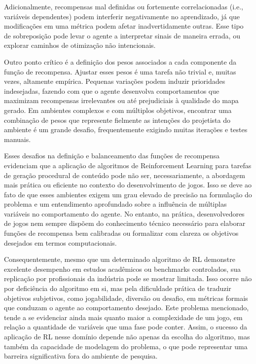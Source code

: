 Adicionalmente, recompensas mal definidas ou fortemente correlacionadas (i.e., variáveis dependentes) 
podem interferir negativamente no aprendizado, já que modificações em uma métrica podem afetar inadvertidamente outras. 
Esse tipo de sobreposição pode levar o agente a interpretar sinais de maneira errada, ou explorar caminhos de otimização não intencionais.



Outro ponto crítico é a definição dos pesos associados a cada componente da função de recompensa. 
Ajustar esses pesos é uma tarefa não trivial e, muitas vezes, altamente empírica. Pequenas variações 
podem induzir prioridades indesejadas, fazendo com que o agente desenvolva comportamentos que maximizam 
recompensas irrelevantes ou até prejudiciais à qualidade do mapa gerado. Em ambientes complexos e 
com múltiplos objetivos, encontrar uma combinação de pesos que represente fielmente as intenções 
do projetista do ambiente é um grande desafio, frequentemente exigindo muitas iterações e testes manuais.



Esses desafios na definição e balanceamento das funções de recompensa evidenciam que a aplicação de 
algoritmos de Reinforcement Learning para tarefas de geração procedural de conteúdo pode não ser, necessariamente, 
a abordagem mais prática ou eficiente no contexto do desenvolvimento de jogos. Isso se deve ao fato de que esses ambientes 
exigem um grau elevado de precisão na formulação do problema e um entendimento aprofundado sobre a influência de múltiplas 
variáveis no comportamento do agente. No entanto, na prática, desenvolvedores de jogos nem sempre dispõem do conhecimento 
técnico necessário para elaborar funções de recompensa bem calibradas ou formalizar com clareza os objetivos desejados em termos 
computacionais.

Consequentemente, mesmo que um determinado algoritmo de RL demonstre excelente desempenho em estudos acadêmicos ou benchmarks controlados, 
sua replicação por profissionais da indústria pode se mostrar limitada. Isso ocorre não por deficiência do algoritmo em si, mas 
pela dificuldade prática de traduzir objetivos subjetivos, como jogabilidade, diversão ou desafio, em métricas formais que 
conduzam o agente ao comportamento desejado. Este problema mencionado, tende a se evidenciar ainda mais quanto
maior a complexidade de um jogo, em relação a quantidade de variáveis que uma fase pode conter. Assim, o sucesso 
da aplicação de RL nesse domínio depende não apenas da escolha do 
algoritmo, mas também da capacidade de modelagem do problema, o que pode representar uma barreira significativa fora do 
ambiente de pesquisa.

